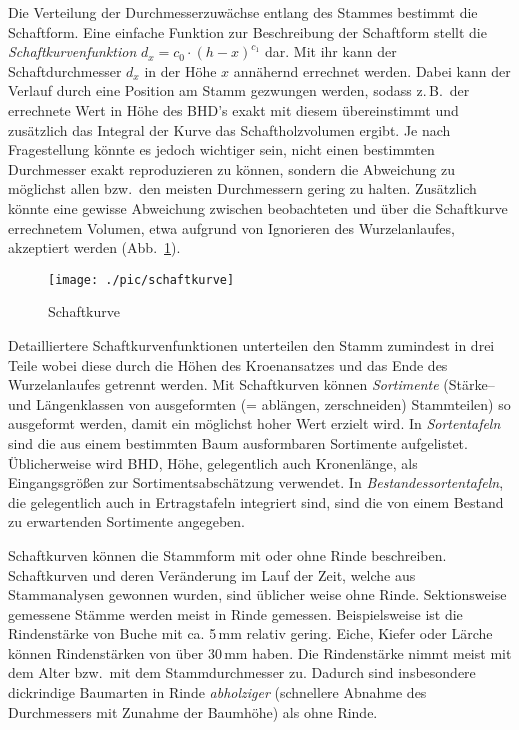 \documentclass[twocolumn]{scrartcl}
\begin{document}
Die Verteilung der Durchmesserzuwächse entlang des Stammes bestimmt die
Schaftform. Eine einfache Funktion zur Beschreibung der Schaftform stellt die
\emph{Schaftkurvenfunktion} $d_x = c_0 \cdot (h - x)^{c_1}$
dar. Mit ihr kann der Schaftdurchmesser $d_x$ in der Höhe $x$ annähernd
errechnet werden. Dabei kann der Verlauf durch eine Position am Stamm gezwungen
werden, sodass z.\,B.\ der errechnete Wert in Höhe des BHD's exakt mit diesem
übereinstimmt und zusätzlich das Integral der Kurve das Schaftholzvolumen
ergibt. Je nach Fragestellung könnte es jedoch wichtiger sein, nicht einen
bestimmten Durchmesser exakt reproduzieren zu können, sondern die Abweichung zu
möglichst allen bzw.\ den meisten Durchmessern gering zu halten. Zusätzlich
könnte eine gewisse Abweichung zwischen beobachteten und über die Schaftkurve
errechnetem Volumen, etwa aufgrund von Ignorieren des Wurzelanlaufes, akzeptiert
werden (Abb.~\ref{fig:schaftkurve}).

\begin{figure}[htbp]
  \centering
  \texttt{[image: ./pic/schaftkurve]}
  \caption{Schaftkurve}
  \label{fig:schaftkurve}
\end{figure}

Detailliertere Schaftkurvenfunktionen unterteilen den Stamm zumindest in drei
Teile wobei diese durch die Höhen des Kroenansatzes und das Ende des
Wurzelanlaufes getrennt werden. Mit Schaftkurven können
\emph{Sortimente} (Stärke-- und Längenklassen von ausgeformten
(= ablängen, zerschneiden) Stammteilen) so ausgeformt werden, damit ein
möglichst hoher Wert erzielt wird. In \emph{Sortentafeln}
sind die aus einem bestimmten Baum ausformbaren Sortimente aufgelistet.
Üblicherweise wird BHD, Höhe, gelegentlich auch Kronenlänge, als Eingangsgrößen
zur Sortimentsabschätzung verwendet. In \emph{Bestandessortentafeln}, die
gelegentlich auch in Ertragstafeln integriert sind, sind die von einem Bestand
zu erwartenden Sortimente angegeben.

Schaftkurven können die Stammform mit oder ohne Rinde beschreiben. Schaftkurven
und deren Veränderung im Lauf der Zeit, welche aus Stammanalysen gewonnen
wurden, sind üblicher weise ohne Rinde. Sektionsweise gemessene Stämme werden
meist in Rinde gemessen. Beispielsweise ist die Rindenstärke von Buche mit ca.
5\,mm relativ gering. Eiche, Kiefer oder Lärche können Rindenstärken von über
30\,mm haben.  Die Rindenstärke nimmt meist mit dem Alter bzw.\ mit dem
Stammdurchmesser zu. Dadurch sind insbesondere dickrindige Baumarten in Rinde
\emph{abholziger} (schnellere Abnahme des Durchmessers mit Zunahme der Baumhöhe)
als ohne Rinde.
\end{document}
